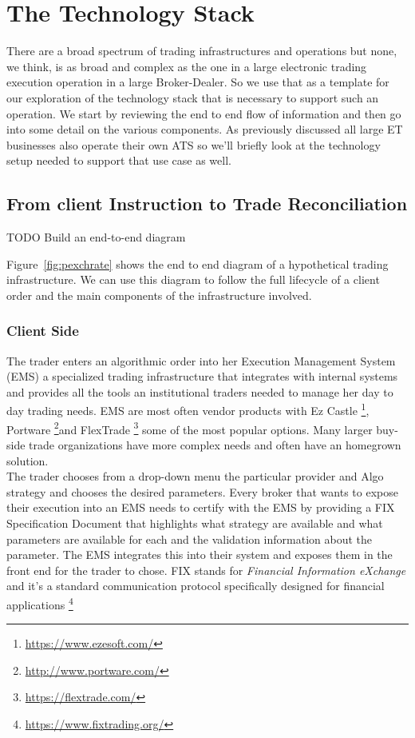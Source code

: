 
\chapter{The Technology Stack}
There are a broad spectrum of trading infrastructures and operations but none, we think, is as broad and complex as the one in a large electronic trading execution operation in a large Broker-Dealer. So we use that as a template for our exploration of the technology stack that is necessary to support such an operation. We start by reviewing the end to end flow of information and then go into some detail on the various components. As previously discussed all large ET businesses also operate their own ATS so we'll briefly look at the technology setup needed to support that use case as well.
\section{From client Instruction to Trade Reconciliation}
TODO Build an end-to-end diagram

Figure~\ref{fig:pexchrate} shows the end to end diagram of a hypothetical trading infrastructure. We can use this diagram to follow the full lifecycle of a client order and the main components of the infrastructure involved.
\subsection{Client Side}
The trader enters an algorithmic order into her Execution Management System (EMS) a specialized trading infrastructure that integrates with internal systems and provides all the tools an institutional traders needed to manage her day to day trading needs. EMS are most often vendor products with Ez Castle \footnote{\url{https://www.ezesoft.com/}}, Portware \footnote{\url{http://www.portware.com/}}and FlexTrade \footnote{\url{https://flextrade.com/}} some of the most popular options. Many larger buy-side trade organizations have more complex needs and often have an homegrown solution.\\

The trader chooses from a drop-down menu the particular provider and Algo strategy and  chooses the desired parameters. Every broker that wants to expose their execution into an EMS needs to certify with the EMS by providing a FIX Specification Document that highlights what strategy are available and what parameters are available for each and the validation information about the parameter. The EMS integrates this into their system and exposes them in the front end for the trader to chose. FIX stands for \emph{Financial Information eXchange} and it's a standard communication protocol specifically designed for financial applications \footnote{\url{https://www.fixtrading.org/}}\\

